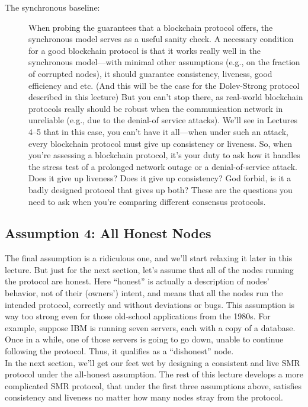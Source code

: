 \begin{description}
    \item[The synchronous baseline:] When probing the guarantees that a blockchain protocol
    offers, the synchronous model serves as a useful sanity check. A necessary condition for a
    good blockchain protocol is that it works really well in the synchronous model—with minimal
    other assumptions (e.g., on the fraction of corrupted nodes), it should guarantee consistency,
    liveness, good efficiency and etc. (And this will be the case for the Dolev-Strong protocol described in this lecture) But you can’t stop there, as real-world blockchain protocols really
    should be robust when the communication network in unreliable (e.g., due to the denial-of service attacks). We’ll see in Lectures 4–5 that in this case, you can’t have it all—when under
    such an attack, every blockchain protocol must give up consistency or liveness.
    So, when you’re assessing a blockchain protocol, it’s your duty to ask how it handles the
    stress test of a prolonged network outage or a denial-of-service attack. Does it give up liveness?
    Does it give up consistency? God forbid, is it a badly designed protocol that gives up both? These are the
    questions you need to ask when you're
    comparing different consensus protocols.
\end{description}


\subsection{Assumption 4: All Honest Nodes}
The final assumption is a ridiculous one, and we’ll start relaxing it later in this lecture. But just
for the next section, let’s assume that all of the nodes running the protocol are honest. Here
“honest” is actually a description of nodes’ behavior, not of their (owners’) intent, and means
that all the nodes run the intended protocol, correctly and without deviations or bugs.
This assumption is way too strong even for those old-school applications from the 1980s.
For example, suppose IBM is running seven servers, each with a copy of a database. Once in
a while, one of those servers is going to go down, unable to continue following the protocol.
 Thus, it qualifies as a “dishonest” node.\\
In the next section, we’ll get our feet wet by designing a consistent and live SMR protocol
under the all-honest assumption. The rest of this lecture develops a more complicated SMR
protocol, that under the first three assumptions above, satisfies consistency and liveness no
matter how many nodes stray from the protocol.

